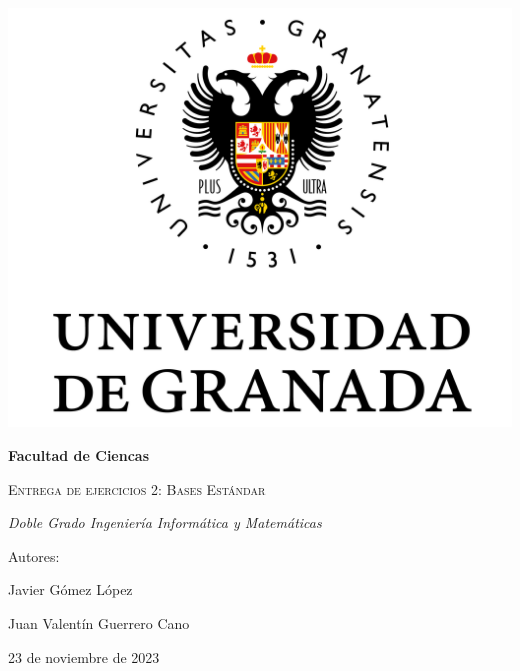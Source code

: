 \documentclass[10pt,a4paper]{article}
\begin{document}
	
\begin{titlepage}
	\centering
	{\includegraphics[scale=0.5]{Logo_UGR.png}\par}
	\vspace{1cm}
	{\bfseries\Large Facultad de Ciencas \par}
	\vspace{2.5cm}
	{\scshape\Huge Entrega de ejercicios 2: Bases Estándar\par}
	\vspace{3cm}
	{\itshape\Large Doble Grado Ingeniería Informática y Matemáticas}
	\vfill
	{\Large Autores: \par}
	{\Large Javier Gómez López \par}
	{\Large Juan Valentín Guerrero Cano \par}
	\vfill
	{\Large 23 de noviembre de 2023 \par}
\end{titlepage}

\thispagestyle{empty}
\null
\vfill
\end{document}
